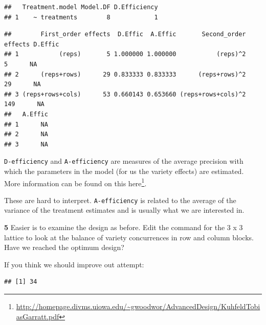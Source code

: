 \documentclass[
]{book}
\makeatletter
\newenvironment{Shaded}{\begin{snugshade}}{\end{snugshade}}
\newcommand{\FloatTok}[1]{\textcolor[rgb]{0.00,0.00,0.81}{#1}}
\newcommand{\NormalTok}[1]{#1}
\newcommand{\SpecialCharTok}[1]{\textcolor[rgb]{0.00,0.00,0.00}{#1}}
\renewcommand{\href}[2]{#2\footnote{\url{#1}}}
\newenvironment{kframe}{%
\medskip{}
\setlength{\fboxsep}{.8em}
 \def\at@end@of@kframe{}%
 \ifinner\ifhmode%
  \def\at@end@of@kframe{\end{minipage}}%
  \begin{minipage}{\columnwidth}%
 \fi\fi%
 \def\FrameCommand##1{\hskip\@totalleftmargin \hskip-\fboxsep
 \colorbox{shadecolor}{##1}\hskip-\fboxsep
     \hskip-\linewidth \hskip-\@totalleftmargin \hskip\columnwidth}%
 \MakeFramed {\advance\hsize-\width
   \@totalleftmargin\z@ \linewidth\hsize
   \@setminipage}}%
 {\par\unskip\endMakeFramed%
 \at@end@of@kframe}
\newenvironment{rmdblock}[1]
  {
  \begin{itemize}
  \renewcommand{\labelitemi}{
    \raisebox{-.7\height}[0pt][0pt]{
      {\setkeys{Gin}{width=3em,keepaspectratio}\texttt{[image: images/\#1]}}
    }
  }
  \setlength{\fboxsep}{1em}
  \begin{kframe}
  \item
  }
  {
  \end{kframe}
  \end{itemize}
  }
\newenvironment{rmdquiz}
  {\begin{rmdblock}{quiz}}
  {\end{rmdblock}}
\makeatother
\begin{document}
\begin{verbatim}
##   Treatment.model Model.DF D.Efficiency
## 1    ~ treatments        8            1
\end{verbatim}

\begin{Shaded}
\end{Shaded}

\begin{verbatim}
##        First_order effects  D.Effic  A.Effic       Second_order effects D.Effic
## 1           (reps)       5 1.000000 1.000000           (reps)^2       5      NA
## 2      (reps+rows)      29 0.833333 0.833333      (reps+rows)^2      29      NA
## 3 (reps+rows+cols)      53 0.660143 0.653660 (reps+rows+cols)^2     149      NA
##   A.Effic
## 1      NA
## 2      NA
## 3      NA
\end{verbatim}

\texttt{D-efficiency} and \texttt{A-efficiency} are measures of the average precision with which the parameters in the model (for us the variety effects) are estimated. More information can be found on this \href{http://homepage.divms.uiowa.edu/~gwoodwor/AdvancedDesign/KuhfeldTobiasGarratt.pdf}{here}.

These are hard to interpret. \texttt{A-efficiency} is related to the average of the variance of the treatment estimates and is usually what we are interested in.

\begin{rmdquiz}
\textbf{5} Easier is to examine the design as before. Edit the command for the 3 x 3 lattice to look at the balance of variety concurrences in row and column blocks. Have we reached the optimum design?
\end{rmdquiz}

If you think we should improve out attempt:

\begin{Shaded}
\end{Shaded}

\begin{verbatim}
## [1] 34
\end{verbatim}
\end{document}
